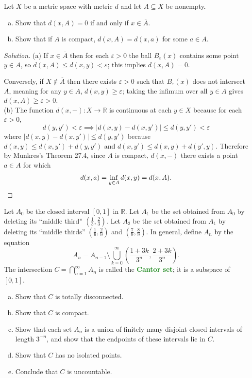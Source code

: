 \documentclass[10pt]{article}
\providecommand{\ol}{\overline}
\providecommand{\eps}{\varepsilon}
\providecommand{\RR}{\mathbb R}
\providecommand{\ii}{\item}
\newenvironment{soln}{\begin{proof}[Solution]}{\end{proof}}
\providecommand{\vocab}[1]{{\textbf{\textcolor{ForestGreen}{#1}}}}
\providecommand{\abs}[1]{\left|#1\right|}
\begin{document}
\begin{problem}
    [Munkres 27.2ab]
    Let $X$ be a metric space with metric $d$ and let $A\subseteq X$ be nonempty.
    \begin{enumerate}[(a)]
        \ii Show that $d(x,A) = 0$ if and only if $x\in\ol A$.
	\ii Show that if $A$ is compact, $d(x,A) = d(x,a)$ for some $a\in A$.
    \end{enumerate}
\end{problem}

\begin{soln}
    (a) If $x\in\ol A$ then for each $\eps>0$
    the ball $B_\eps(x)$ contains some point $y\in A$, so
    $d(x,A) \le d(x,y) < \eps$; this implies $d(x,A) = 0$.

    Conversely, if $X\notin\ol A$ then there exists $\eps>0$
    such that $B_\eps(x)$ does not intersect $A$, meaning
    for any $y\in A$, $d(x,y)\ge \eps$; taking the infimum over all $y\in A$
    gives $d(x,A) \ge \eps > 0$.\\

    (b) The function $d(x,-)\colon X\to\RR$ is continuous at each $y\in X$ because
    for each $\eps>0$,
    \begin{equation*}
	d(y,y') < \eps \implies \abs{d(x,y) - d(x,y')} \le d(y,y') < \eps
    \end{equation*}
    where $\abs{d(x,y) - d(x,y')} \le d(y,y')$ because
    $d(x,y) \le d(x,y') + d(y,y')$ and $d(x,y') \le d(x,y) + d(y',y)$.
    Therefore by Munkres's Theorem 27.4, since $A$ is compact,
    $d(x,-)$ there exists a point $a\in A$ for which
    \begin{equation*}
	d(x,a) = \inf_{y\in A}d(x,y) = d(x,A).\qedhere
    \end{equation*}
\end{soln}

\begin{problem}
    [Munkres 27.6]
    Let $A_0$ be the closed interval $[0,1]$ in $\RR$.
    Let $A_1$ be the set obtained from $A_0$ by deleting its ``middle third''
    $(\frac13,\frac23)$. Let $A_2$ be the set obtained from $A_1$
    by deleting its ``middle thirds'' $(\frac19,\frac29)$ and $(\frac79,\frac89)$.
    In general, define $A_n$ by the equation
    \begin{equation*}
	A_n = A_{n-1}\setminus\bigcup_{k=0}^\infty
	\left(\frac{1+3k}{3^n},\frac{2+3k}{3^n}\right).
    \end{equation*}
    The intersection $C = \bigcap_{n=1}^\infty A_n$ is called the
    \vocab{Cantor set}; it is a subspace of $[0,1]$.
    \begin{enumerate}[(a)]
        \ii Show that $C$ is totally disconnected.
	\ii Show that $C$ is compact.
	\ii Show that each set $A_n$ is a union of
	finitely many disjoint closed intervals of length $3^{-n}$,
	and show that the endpoints of these intervals lie in $C$.
	\ii Show that $C$ has no isolated points.
	\ii Conclude that $C$ is uncountable.
    \end{enumerate}
\end{problem}
\end{document}
